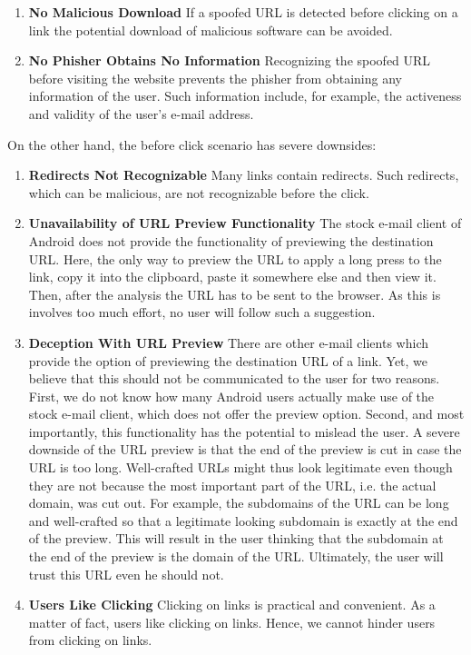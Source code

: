 \begin{description}[leftmargin=0cm]
\begin{enumerate}
	\item \textbf{No Malicious Download} If a spoofed URL is detected before clicking on a link the potential download of  malicious software can be avoided. 
	\item \textbf{No Phisher Obtains No Information} Recognizing the spoofed URL before visiting the website prevents the phisher from obtaining any information of the user. Such information include, for example, the activeness and validity of the user's e-mail address. 
\end{enumerate}

On the other hand, the before click scenario has severe downsides:

\begin{enumerate}
	\item \textbf{Redirects Not Recognizable} Many links contain redirects. Such redirects, which can be malicious, are not recognizable before the click.
	\item \textbf{Unavailability of URL Preview Functionality} The stock e-mail client of Android does not provide the functionality of previewing the destination URL. 
Here, the only way to preview the URL to apply a long press to the link, copy it into the clipboard, paste it somewhere else and then view it. 
Then, after the analysis the URL has to be sent to the browser.
As this is involves too much effort, no user will follow such a suggestion.
	\item \textbf{Deception With URL Preview} There are other e-mail clients which provide the option of previewing the destination URL of a link.
Yet, we believe that this should not be communicated to the user for two reasons.
First, we do not know how many Android users actually make use of the stock e-mail client, which does not offer the preview option.
Second, and most importantly, this functionality has the potential to mislead the user.
A severe downside of the URL preview is that the end of the preview is cut in case the URL is too long.
 Well-crafted URLs might thus look legitimate even though they are not because the most important part of the URL, i.e. the actual domain, was cut out.
 For example, the subdomains of the URL can be long and well-crafted so that a legitimate looking subdomain is exactly at the end of the preview.
 This will result in the user thinking that the subdomain at the end of the preview is the domain of the URL.
 Ultimately, the user will trust this URL even he should not.
	\item \textbf{Users Like Clicking} Clicking on links is practical and convenient. As a matter of fact, users like clicking on links. Hence, we cannot hinder users from clicking on links.
\end{enumerate}


\end{description}
